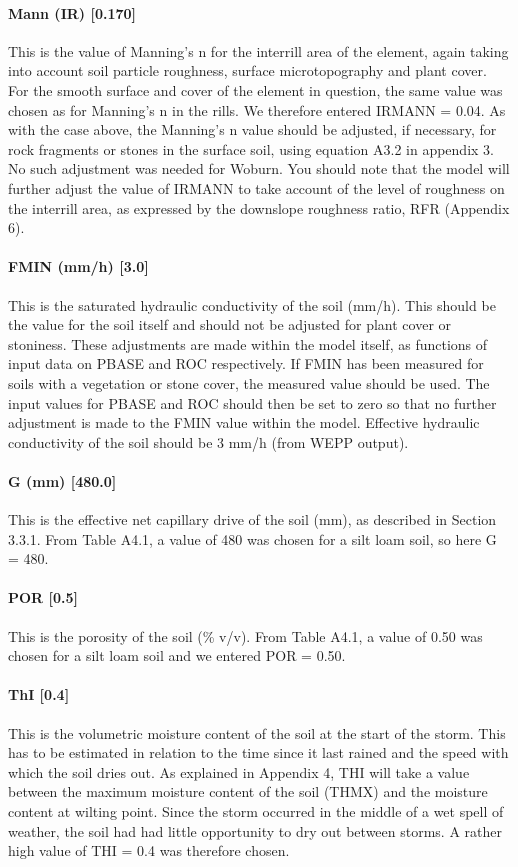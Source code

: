 \paragraph{Mann (IR) [0.170]}
This is the value of Manning's n for the interrill area of the element, again taking into account soil particle roughness, surface microtopography and plant cover. For the smooth surface and cover of the element in question, the same value was chosen as for Manning's n in the rills. We therefore entered IRMANN = 0.04.
As with the case above, the Manning's n value should be adjusted, if necessary, for rock fragments or stones in the surface soil, using equation A3.2 in appendix 3. No such adjustment was needed for Woburn. You should note that the model will further adjust the value of IRMANN to take account of the level of roughness on the interrill area, as expressed by the downslope roughness ratio, RFR (Appendix 6).
 
\paragraph{FMIN (mm/h) [3.0]}
This is the saturated hydraulic conductivity of the soil (mm/h). This should be the value for the soil itself and should not be adjusted for plant cover or stoniness. These adjustments are made within the model itself, as functions of input data on PBASE and ROC respectively. If FMIN has been measured for soils with a vegetation or stone cover, the measured value should be used. The input values for PBASE and ROC should then be set to zero so that no further adjustment is made to the FMIN value within the model.
Effective hydraulic conductivity of the soil should be 3 mm/h (from WEPP output).
 
\paragraph{G (mm) [480.0]}
This is the effective net capillary drive of the soil (mm), as described in Section 3.3.1. From Table A4.1, a value of 480 was chosen for a silt loam soil, so here G = 480.
 
\paragraph{POR [0.5]}
This is the porosity of the soil (\% v/v). From Table A4.1, a value of 0.50 was chosen for a silt loam soil and we entered POR = 0.50.
 
\paragraph{ThI [0.4]}
This is the volumetric moisture content of the soil at the start of the storm. This has to be estimated in relation to the time since it last rained and the speed with which the soil dries out. As explained in Appendix 4, THI will take a value between the maximum moisture content of the soil (THMX) and the moisture content at wilting point. Since the storm occurred in the
middle of a wet spell of weather, the soil had had little opportunity to dry out between storms. A rather high value of THI = 0.4 was therefore chosen.

